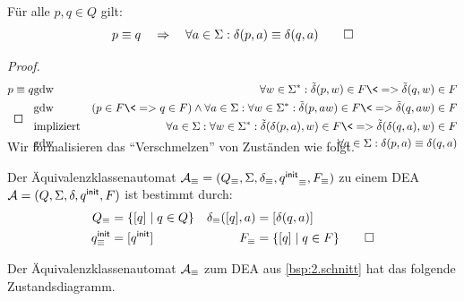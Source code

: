 \begin{lemma}
\label{eqn:delta-wohldefiniert}
Für alle $p,q\in Q$ gilt:
        \[
        p \equiv q \quad\=>\quad \forall a\in\Sigma: \delta(p,a)\equiv\delta(q,a)
        \qedhere
        \]
\end{lemma}
\begin{proof}
\begin{eqnarray*}
        p \equiv q  
        & \text{gdw} & \forall w\in\Sigma^*: \tilde\delta(p,w)\in F \<=> \tilde\delta(q,w) \in F\\
        & \text{gdw} & (p\in F \<=> q \in F) \land \forall a\in \Sigma: \forall w\in\Sigma^*:
        \tilde\delta(p,aw)\in F \<=> \tilde\delta(q,aw)\in F\\
        &\text{impliziert} &  \forall a\in\Sigma: \forall w\in\Sigma^*: \tilde\delta(\delta(p,a),w)\in F \<=> \tilde\delta(\delta(q,a),w)\in F\\
        & \text{gdw} & \forall a\in\Sigma: \delta(p,a)\equiv\delta(q,a)
        \qedherefixeqnarray
\end{eqnarray*}
\end{proof}
Wir formalisieren das "`Verschmelzen"' von Zuständen wie folgt.
\begin{Def}[name={[Äquivalenzklassenautomat]}]
        Der Äquivalenzklassenautomat $\mathcal{A}_\equiv=(Q_\equiv,\Sigma,\delta_\equiv,{q^\mathsf{init}}_\equiv,F_\equiv)$ zu einem \acs*{DEA} $\mathcal{A}=(Q,\Sigma,\delta,q^\mathsf{init},F)$ ist bestimmt durch:
        \begin{align*}
                Q_\equiv &= \{[q]\mid q\in Q\} & \delta_\equiv([q],a) &= [\delta(q,a)]\\
                q^\mathsf{init}_\equiv &= [q^\mathsf{init}] & F_\equiv & =\{[q]\mid q\in F \}
                \qedhere
        \end{align*}
\end{Def}

\begin{Bsp}
Der Äquivalenzklassenautomat $\mathcal{A}_\equiv$ zum \ac{DEA} aus \autoref{bsp:2.schnitt} hat das folgende Zustandsdiagramm.
\begin{center}
   \captionsetup{type=figure}
\end{center}
\end{Bsp}



